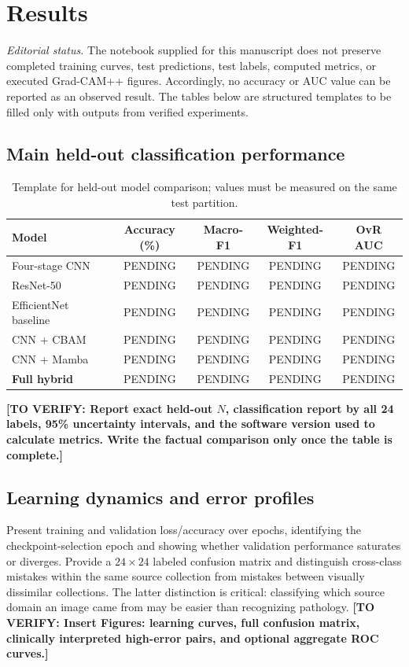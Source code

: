 \documentclass[11pt,a4paper]{article}
\newcommand{\todo}[1]{\textcolor{red!70!black}{\textbf{[TO VERIFY: #1]}}}
\newcommand{\pending}{\textsf{PENDING}}
\begin{document}
\section{Results}\label{sec:results}
\noindent\textit{Editorial status.} The notebook supplied for this manuscript does not preserve completed training curves, test predictions, test labels, computed metrics, or executed Grad-CAM++ figures. Accordingly, no accuracy or AUC value can be reported as an observed result. The tables below are structured templates to be filled only with outputs from verified experiments.

\subsection{Main held-out classification performance}
\begin{table}[h]
\centering\small
\caption{Template for held-out model comparison; values must be measured on the same test partition.}
\label{tab:main-results}
\begin{tabular}{lcccc}
\toprule
Model & Accuracy (\%) & Macro-F1 & Weighted-F1 & OvR AUC\\
\midrule
Four-stage CNN & \pending & \pending & \pending & \pending\\
ResNet-50 & \pending & \pending & \pending & \pending\\
EfficientNet baseline & \pending & \pending & \pending & \pending\\
CNN + CBAM & \pending & \pending & \pending & \pending\\
CNN + Mamba & \pending & \pending & \pending & \pending\\
\textbf{Full hybrid} & \pending & \pending & \pending & \pending\\
\bottomrule
\end{tabular}
\end{table}

\noindent\todo{Report exact held-out $N$, classification report by all 24 labels, 95\% uncertainty intervals, and the software version used to calculate metrics. Write the factual comparison only once the table is complete.}

\subsection{Learning dynamics and error profiles}
Present training and validation loss/accuracy over epochs, identifying the checkpoint-selection epoch and showing whether validation performance saturates or diverges. Provide a $24\times24$ labeled confusion matrix and distinguish cross-class mistakes within the same source collection from mistakes between visually dissimilar collections. The latter distinction is critical: classifying which source domain an image came from may be easier than recognizing pathology. \todo{Insert Figures: learning curves, full confusion matrix, clinically interpreted high-error pairs, and optional aggregate ROC curves.}
\end{document}
